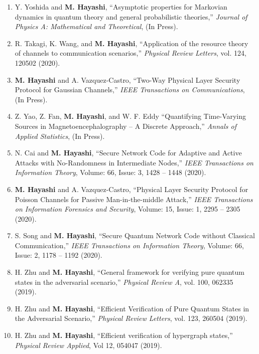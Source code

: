 \documentclass[a4paper,12pt,oneside]{article}
\begin{document}
\begin{enumerate}
\item
Y. Yoshida and \textbf{M. Hayashi},
``Asymptotic properties for Markovian dynamics in quantum theory and general probabilistic theories,'' 
{\em Journal of Physics A: Mathematical and Theoretical}, 
(In Press).

\item
R. Takagi, K. Wang, and \textbf{M. Hayashi},
``Application of the resource theory of channels to communication scenarios,'' 
{\em Physical Review Letters}, 
vol. 124, 120502 (2020).

\item 
\textbf{M. Hayashi} and A. Vazquez-Castro,
``Two-Way Physical Layer Security Protocol for
Gaussian Channels,'' 
{\em IEEE Transactions on Communications},
(In Press).

\item 
Z. Yao, Z. Fan, \textbf{M. Hayashi}, and W. F. Eddy
``Quantifying Time-Varying Sources in Magnetoencephalography -- A Discrete Approach,''
{\em Annals of Applied Statistics},
(In Press).

\item 
N. Cai and \textbf{M. Hayashi},
``Secure Network Code for Adaptive and Active Attacks with No-Randomness in Intermediate Nodes,''
{\em IEEE Transactions on Information Theory}, 
Volume: 66, Issue: 3, 1428 -- 1448 (2020). 

\item 
\textbf{M. Hayashi} and A. Vazquez-Castro,
``Physical Layer Security Protocol for Poisson Channels 
for Passive Man-in-the-middle Attack,'' 
{\em IEEE Transactions on Information Forensics and Security},
Volume: 15, Issue: 1, 2295 -- 2305 (2020). 

\item 
S. Song and \textbf{M. Hayashi},
``Secure Quantum Network Code without Classical Communication,''
{\em IEEE Transactions on Information Theory}, 
Volume: 66, Issue: 2, 1178 -- 1192 (2020). 

\item 
H. Zhu and \textbf{M. Hayashi},
``General framework for verifying pure quantum states in the adversarial scenario,''
{\em Physical Review A}, 
vol. 100, 062335 (2019).
 
\item 
H. Zhu and \textbf{M. Hayashi},
``Efficient Verification of Pure Quantum States in the Adversarial Scenario,''
{\em Physical Review Letters}, 
vol. 123, 260504 (2019).

\item 
H. Zhu and \textbf{M. Hayashi},
``Efficient verification of hypergraph states,''
{\em Physical Review Applied}, 
Vol 12, 054047 (2019).


\end{enumerate}
\end{document}
